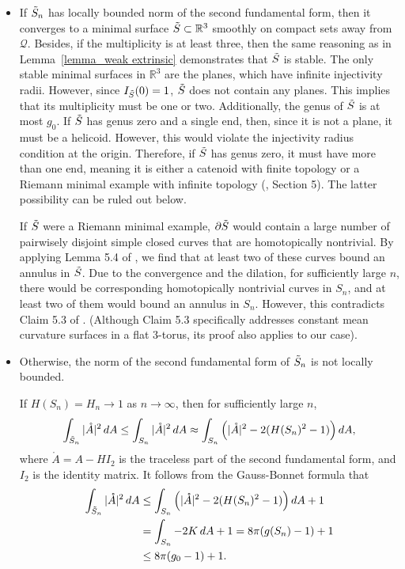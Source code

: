 \documentclass[12pt,a4paper]{amsart}
\numberwithin{equation}{section}
\theoremstyle{plain}
\theoremstyle{named}
\theoremstyle{definition}
\begin{document}
    \begin{itemize}
        \item If $\Tilde{S}_n$ has locally bounded norm of the second fundamental form, then it converges to a minimal surface $\Tilde{S}\subset \mathbb{R}^3$ smoothly on compact sets away from $\mathcal{Q}$. 
        Besides, if the multiplicity is at least three, then the same reasoning as in Lemma~\ref{lemma_weak extrinsic} demonstrates that $\Tilde{S}$ is stable. 
         The only stable minimal surfaces in $\mathbb{R}^3$ are the planes,  
         which have infinite injectivity radii. However, since $I_{\Tilde{S}}(0) = 1$, $\Tilde{S}$ does not contain any planes. This implies that its multiplicity must be one or two. Additionally, the genus of $\Tilde{S}$ is at most $g_0$. If $\Tilde{S}$ has genus zero and a single end, then, since it is not a plane, it must be a helicoid. However, this would violate the injectivity radius condition at the origin. Therefore, if $\Tilde{S}$ has genus zero, it must have more than one end, meaning it is either a catenoid with finite topology or a Riemann minimal example with infinite topology (\cite{Meeks-Tinaglia}, Section 5). The latter possibility can be ruled out below.

     If $\Tilde{S}$ were a Riemann minimal example, $\partial\Tilde{S}$ would contain a large number of pairwisely disjoint simple closed curves that are homotopically nontrivial. By applying Lemma 5.4 of \cite{Meeks-Tinaglia}, we find that at least two of these curves bound an annulus in $\Tilde{S}$. Due to the convergence and the dilation, for sufficiently large $n$, there would be corresponding homotopically nontrivial curves in $S_n$, and at least two of them would bound an annulus in $S_n$. However, this contradicts Claim 5.3 of \cite{Meeks-Tinaglia}. (Although Claim 5.3 specifically addresses constant mean curvature surfaces in a flat 3-torus, its proof also applies to our case). 


        \item Otherwise, the norm of the second fundamental form of $\Tilde{S}_n$ is not locally bounded.
        
        If $H(S_n)=H_n\rightarrow 1$ as $n\rightarrow\infty$,
        then for sufficiently large $n$, 
        \begin{equation*}
             \int_{\Tilde{S}_n}|\mathring{A}|^2\,dA\leq \int_{S_n}|\mathring{A}|^2\,dA \approx\int_{S_n}\left(|\mathring{A}|^2-2(H(S_n)^2-1)\right)dA,
        \end{equation*}
        where $\mathring{A}=A-HI_2$ is the traceless part of the second fundamental form, and $I_2$ is the identity matrix.
        It follows from the Gauss-Bonnet formula that
        \begin{align}\label{equ_Gauss of Bryant}
             \int_{\Tilde{S}_n}|\mathring{A}|^2\,dA &\leq \int_{S_n}\left(|\mathring{A}|^2-2(H(S_n)^2-1)\right)dA+1\\\nonumber
            &=\int_{S_n}-2K\,dA+1=8\pi(g(S_n)-1)+1\\\nonumber
            &\leq 8\pi(g_0-1)+1.
        \end{align}
        

\end{itemize}
\end{document}
